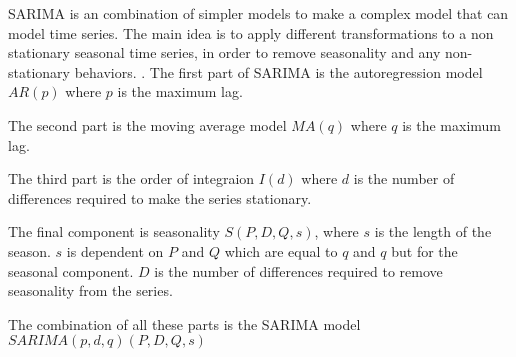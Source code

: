 SARIMA is an combination of simpler models to make a complex model that can model time series.
The main idea is to apply different transformations to a non stationary seasonal time series,
in order to remove seasonality and any non-stationary behaviors.
\citet[p. 327-385]{Utlaut2008}.
The first part of SARIMA is the autoregression model
$AR(p)$ where $p$ is the maximum lag.

The second part is the moving average model $MA(q)$ where $q$ is the maximum lag.

The third part is the order of integraion $I(d)$ where $d$ is the number of
differences required to make the series stationary.

The final component is seasonality $S(P, D, Q, s)$, where $s$ is the length
of the season.
$s$ is dependent on $P$ and $Q$ which are equal to $q$ and $q$ but for the seasonal component.
$D$ is the number of differences required to remove seasonality from the series.

The combination of all these parts is the SARIMA model $SARIMA(p, d, q)(P, D, Q, s)$






